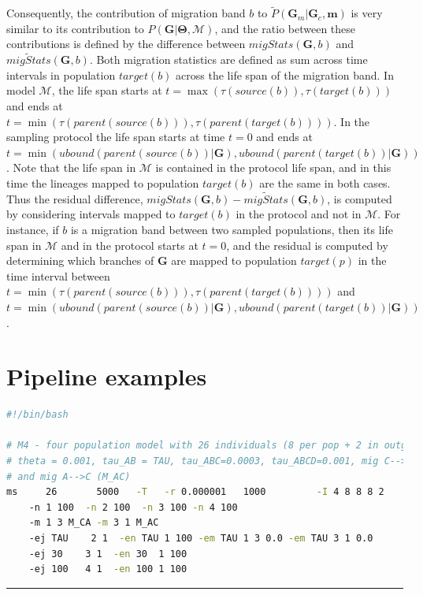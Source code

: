 \documentclass[11pt]{article}
\newcommand{\vect}[1]{\boldsymbol{\mathbf{#1}}}
\newcommand{\M}{\mathcal{M}}
\newcommand{\G}{\vect{G}}
\newcommand{\T}{\vect{\Theta}}
\newcommand{\Pref}{\widetilde{P}}
\newcommand{\1}{\mathbbm{1}}
\newcommand{\Gc}{\G_c}
\newcommand{\Gm}{\G_m}
\newcommand{\migs}{\vect{m}}
\begin{document}
Consequently, the contribution of migration band $b$ to $\Pref(\Gm|\Gc,\migs)$ is very similar to its contribution to $P(\G|\T,\M)$, and the ratio
between these contributions is defined by the difference between $migStats(\G,b)$ and $\widetilde{migStats}(\G,b)$.
Both migration statistics are defined as sum across time intervals in population $target(b)$ across the life span of the migration band.
In model $\M$, the life span starts at $t=\max(\tau(source(b)),\tau(target(b)))$ and ends at \\ $t=\min(\tau(parent(source(b))),\tau(parent(target(b))))$.
In the sampling protocol the life span starts at time $t=0$ and ends at $t=\min(ubound(parent(source(b))|\G),ubound(parent(target(b))|\G))$.
Note that the life span in $\M$ is contained in the protocol life span, and in this time the lineages mapped to population $target(b)$ are the same in both cases.
Thus the residual difference, $migStats(\G,b)-\widetilde{migStats}(\G,b)$, is computed by considering intervals mapped to $target(b)$ in the protocol and not in $\M$.
For instance, if $b$ is a migration band between two sampled populations, then its life span in $\M$ and in the protocol starts at $t=0$, and the residual is computed by 
determining which branches of $\G$ are mapped to population $target(p)$ in the time interval between $t=\min(\tau(parent(source(b))),\tau(parent(target(b))))$ and
$t=\min(ubound(parent(source(b))|\G),ubound(parent(target(b))|\G))$.




\section{Pipeline examples}\label{ap:scripts}

\begin{lstlisting}[language=bash,caption={\textit{ms} script used to generate data-sets in experiment III}]
#!/bin/bash

# M4 - four population model with 26 individuals (8 per pop + 2 in outgroup),
# theta = 0.001, tau_AB = TAU, tau_ABC=0.0003, tau_ABCD=0.001, mig C-->A (M_CA) 
# and mig A-->C (M_AC)
ms     26       5000   -T   -r 0.000001   1000         -I 4 8 8 8 2
    -n 1 100  -n 2 100  -n 3 100 -n 4 100
    -m 1 3 M_CA -m 3 1 M_AC
    -ej TAU    2 1  -en TAU 1 100 -em TAU 1 3 0.0 -em TAU 3 1 0.0
    -ej 30    3 1  -en 30  1 100
    -ej 100   4 1  -en 100 1 100

\end{lstlisting}

\noindent\rule{16cm}{0.4pt}
\end{document}
